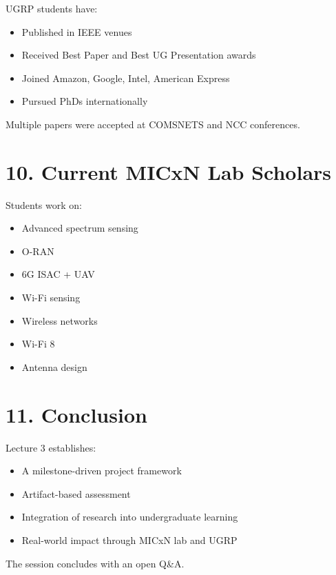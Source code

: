\documentclass[11pt]{article}
\begin{document}
UGRP students have:

\begin{itemize}
\item Published in IEEE venues
\item Received Best Paper and Best UG Presentation awards
\item Joined Amazon, Google, Intel, American Express
\item Pursued PhDs internationally
\end{itemize}

Multiple papers were accepted at COMSNETS and NCC conferences.

\section*{10. Current MICxN Lab Scholars}

Students work on:

\begin{itemize}
\item Advanced spectrum sensing
\item O-RAN
\item 6G ISAC + UAV
\item Wi-Fi sensing
\item Wireless networks
\item Wi-Fi 8
\item Antenna design
\end{itemize}

\section*{11. Conclusion}

Lecture 3 establishes:

\begin{itemize}
\item A milestone-driven project framework
\item Artifact-based assessment
\item Integration of research into undergraduate learning
\item Real-world impact through MICxN lab and UGRP
\end{itemize}

The session concludes with an open Q\&A.
\end{document}
